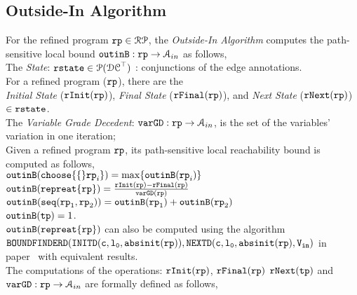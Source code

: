 \subsection{Outside-In Algorithm}
\label{sec:pathsensitive_rb-outinalg}
%
For the refined program $\mathtt{rp} \in \mathcal{RP}$, the \emph{Outside-In Algorithm}
computes the path-sensitive local bound 
$\mathtt{outinB}: \mathtt{rp} \to \mathcal{A}_{in}$ as follows,
\\
The \emph{State}: 
$\mathtt{rstate} \in \mathcal{P}(\mathcal{DC}^{\top})$ : conjunctions of the edge annotations.
\\
For a refined program ($\mathtt{rp}$), there are the 
\\
\emph{Initial State} ($\mathtt{rInit}(\mathtt{rp})$), 
\emph{Final State} ($\mathtt{rFinal}(\mathtt{rp})$), and \emph{Next State} ($\mathtt{rNext}(\mathtt{rp})$)  $\in \mathtt{rstate}$.
\\
The \emph{Variable Grade Decedent}: $\mathtt{varGD} : \mathtt{rp} \to \mathcal{A}_{in}$, is the set of the variables' variation in one iteration;
\\
Given a refined program $\mathtt{rp}$, its path-sensitive local reachability bound is computed as follows,
\\
$\outinB(\rpchoose\{\rprog_i\}) =  \max\{\outinB(\rprog_i)\}$
\\
$\mathtt{outinB}(\mathtt{repreat}\{\mathtt{rp}\}) =  \frac{\mathtt{rInit}(\mathtt{rp}) - \mathtt{rFinal}(\mathtt{rp})}{\mathtt{varGD}(\mathtt{rp})}$
\\
$\mathtt{outinB}(\mathtt{seq}(\mathtt{rp}_1, \mathtt{rp}_2)) =  \mathtt{outinB}(\mathtt{rp}_1)+ \mathtt{outinB}( \mathtt{rp}_2)$
\\
$\mathtt{outinB}(\mathtt{tp}) =  1$.
\\
$\mathtt{outinB}(\mathtt{repreat}\{\mathtt{rp}\})$ can also be computed using the algorithm
\\
$\mathtt{BOUNDFINDERD(INITD(c, l_0, \mathtt{abs}{\mathtt{init}}(\mathtt{rp})), NEXTD(c, l_0, \mathtt{abs}{\mathtt{init}}(\mathtt{rp}), V_{\mathtt{in}} )}$ 
in paper~\cite{GulwaniJK09} with equivalent results.
\\
The computations of the operations: $\mathtt{rInit}(\mathtt{rp})$,
$\mathtt{rFinal}(\mathtt{rp})$ $\mathtt{rNext}(\mathtt{tp})$ and $\mathtt{varGD} : \mathtt{rp} \to \mathcal{A}_{in}$
are formally defined as follows,
